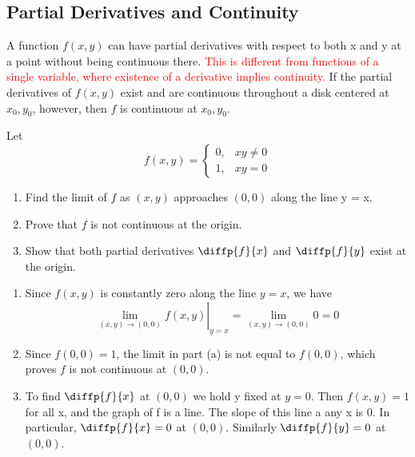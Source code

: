 \documentclass[12pt,a4paper]{article}
\begin{document}
\subsection{Partial Derivatives and Continuity}

A function \(f(x,y)\) can have partial derivatives with respect to both x and y at a point without being continuous there. \textcolor{red}{This is different from functions of a single variable, where existence of a derivative implies continuity.} If the partial derivatives of \(f(x,y)\) exist and are continuous throughout a disk centered at \(x_0,y_0\), however, then \(f\) is continuous at \(x_0,y_0\).

\begin{example}
    Let
    \[f(x,y) = \begin{cases}
        0, & xy \neq 0 \\
        1, & xy = 0
    \end{cases}\]

    \begin{enumerate}[label=\textbf{(\alph*)}]
        \item Find the limit of \(f\) as \((x,y)\) approaches \((0,0)\) along the line y = x.
        \item Prove that \(f\) is not continuous at the origin.
        \item Show that both partial derivatives \(\diffp{f}{x}\) and \(\diffp{f}{y}\) exist at the origin.
        
    \end{enumerate}

\end{example}


\begin{solution}
    \begin{enumerate}[label=\textbf{(\alph*)}]
        \item Since \(f(x,y)\) is constantly zero along the line \(y=x\), we have \[\left. \lim_{(x,y) \to (0,0)} f(x,y) \right|_{y=x} = \lim_{(x,y) \to (0,0)} 0 = 0\]
        \item Since \(f(0,0) = 1\), the limit in part (a) is not equal to \(f(0,0)\), which proves \(f\) is not continuous at \((0,0)\).
        \item To find \(\diffp{f}{x}\) at \((0,0)\) we hold y fixed at  \(y=0\). Then \(f(x,y) = 1\) for all x, and the graph of f is a line. The slope of this line a any x is 0. In particular, \(\diffp{f}{x} = 0\) at \((0,0)\). Similarly \(\diffp{f}{y} = 0\) at \((0,0)\).
    \end{enumerate}
\end{solution}
\end{document}

